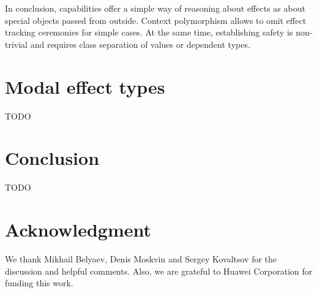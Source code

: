 \documentclass[conference]{IEEEtran}
\begin{document}
    In conclusion, capabilities offer a simple way of reasoning about effects as about special objects passed from outside.
    Context polymorphism allows to omit effect tracking ceremonies for simple cases.
    At the same time, establishing safety is non-trivial and requires class separation of values or dependent types.


    \section{Modal effect types} \label{sec:modal}

    TODO \cite{convent2020doo}\cite{tang2024modal}




    \section{Conclusion}

    TODO %


    \section*{Acknowledgment}

    We thank Mikhail Belyaev, Denis Moskvin and Sergey Kovaltsov for the discussion and helpful comments.
    Also, we are grateful to Huawei Corporation for funding this work.



    
    
\end{document}
